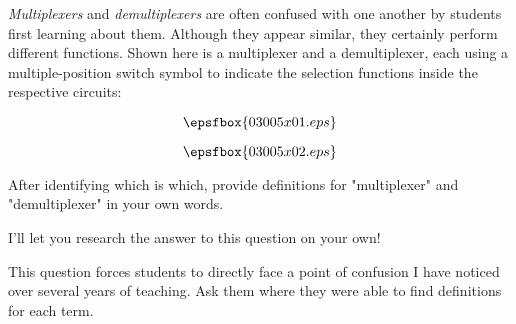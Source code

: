 

{\it Multiplexers} and {\it demultiplexers} are often confused with one another by students first learning about them.  Although they appear similar, they certainly perform different functions.  Shown here is a multiplexer and a demultiplexer, each using a multiple-position switch symbol to indicate the selection functions inside the respective circuits:

$$\epsfbox{03005x01.eps}$$

$$\epsfbox{03005x02.eps}$$

After identifying which is which, provide definitions for "multiplexer" and "demultiplexer" in your own words.







I'll let you research the answer to this question on your own!







This question forces students to directly face a point of confusion I have noticed over several years of teaching.  Ask them where they were able to find definitions for each term.




